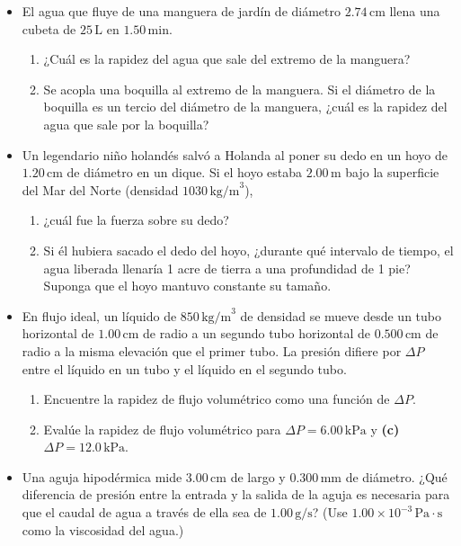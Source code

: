 \documentclass[11pt,a4paper]{article}
\begin{document}
\begin{itemize}
    \item[\textbf{5.}] El agua que fluye de una manguera de jardín de diámetro \(2.74\,\text{cm}\) llena una cubeta de \(25\,\text{L}\) en \(1.50\,\text{min}\).
    \begin{enumerate}
        \item[\textbf{(a)}] ¿Cuál es la rapidez del agua que sale del extremo de la manguera?
        \item[\textbf{(b)}] Se acopla una boquilla al extremo de la manguera. Si el diámetro de la boquilla es un tercio del diámetro de la manguera, ¿cuál es la rapidez del agua que sale por la boquilla?
    \end{enumerate}
    \vspace*{7cm}
    
    \item[\textbf{6.}] Un legendario niño holandés salvó a Holanda al poner su dedo en un hoyo de \(1.20\,\text{cm}\) de diámetro en un dique. Si el hoyo estaba \(2.00\,\text{m}\) bajo la superficie del Mar del Norte (densidad \(1030\,\text{kg/m}^3\)),
    \begin{enumerate}
        \item[\textbf{(a)}] ¿cuál fue la fuerza sobre su dedo?
        \item[\textbf{(b)}] Si él hubiera sacado el dedo del hoyo, ¿durante qué intervalo de tiempo, el agua liberada llenaría 1 acre de tierra a una profundidad de 1 pie? Suponga que el hoyo mantuvo constante su tamaño.
    \end{enumerate}
    \vspace*{7cm}
\end{itemize}

\newpage

\begin{itemize}
    \item[\textbf{7.}] En flujo ideal, un líquido de \(850\,\text{kg/m}^3\) de densidad se mueve desde un tubo horizontal de \(1.00\,\text{cm}\) de radio a un segundo tubo horizontal de \(0.500\,\text{cm}\) de radio a la misma elevación que el primer tubo. La presión difiere por \(\Delta P\) entre el líquido en un tubo y el líquido en el segundo tubo.
    \begin{enumerate}
        \item[\textbf{(a)}] Encuentre la rapidez de flujo volumétrico como una función de \(\Delta P\).
        \item[\textbf{(b)}] Evalúe la rapidez de flujo volumétrico para \(\Delta P = 6.00\,\text{kPa}\) y \textbf{(c)} \(\Delta P = 12.0\,\text{kPa}\).
    \end{enumerate}
    \vspace*{7cm}
    
    \item[\textbf{8.}] Una aguja hipodérmica mide \(3.00\,\text{cm}\) de largo y \(0.300\,\text{mm}\) de diámetro. ¿Qué diferencia de presión entre la entrada y la salida de la aguja es necesaria para que el caudal de agua a través de ella sea de \(1.00\,\text{g/s}\)? (Use \(1.00 \times 10^{-3}\,\text{Pa}\cdot\text{s}\) como la viscosidad del agua.)
    \vspace*{7cm}
\end{itemize}
\end{document}
